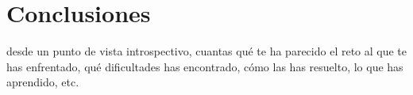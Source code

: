 \chapter{Conclusiones}
{\color{red} desde un punto de vista introspectivo, cuantas qué te ha parecido
el reto al que te has enfrentado, qué dificultades has encontrado,
cómo las has resuelto, lo que has aprendido, etc.}